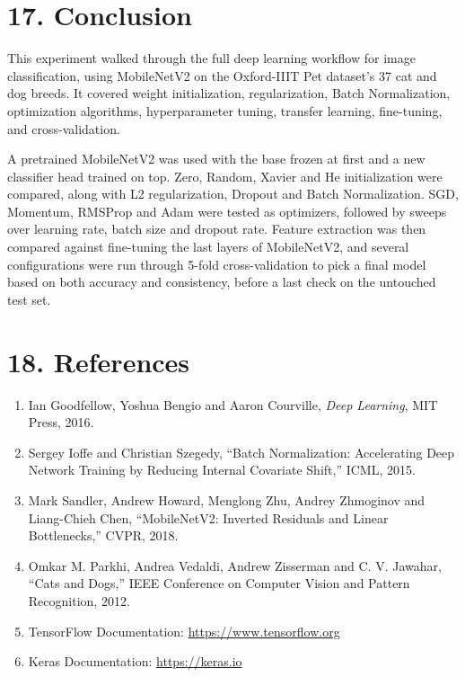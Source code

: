 \documentclass[10pt]{article}
\begin{document}
\section*{17. Conclusion}

This experiment walked through the full deep learning workflow for image classification, using MobileNetV2 on the Oxford-IIIT Pet dataset's 37 cat and dog breeds. It covered weight initialization, regularization, Batch Normalization, optimization algorithms, hyperparameter tuning, transfer learning, fine-tuning, and cross-validation.

A pretrained MobileNetV2 was used with the base frozen at first and a new classifier head trained on top. Zero, Random, Xavier and He initialization were compared, along with L2 regularization, Dropout and Batch Normalization. SGD, Momentum, RMSProp and Adam were tested as optimizers, followed by sweeps over learning rate, batch size and dropout rate. Feature extraction was then compared against fine-tuning the last layers of MobileNetV2, and several configurations were run through 5-fold cross-validation to pick a final model based on both accuracy and consistency, before a last check on the untouched test set.

\section*{18. References}

\begin{enumerate}
\item Ian Goodfellow, Yoshua Bengio and Aaron Courville,
\emph{Deep Learning}, MIT Press, 2016.

\item Sergey Ioffe and Christian Szegedy,
``Batch Normalization: Accelerating Deep Network Training by Reducing
Internal Covariate Shift,'' ICML, 2015.

\item Mark Sandler, Andrew Howard, Menglong Zhu, Andrey Zhmoginov and
Liang-Chieh Chen, ``MobileNetV2: Inverted Residuals and Linear
Bottlenecks,'' CVPR, 2018.

\item Omkar M. Parkhi, Andrea Vedaldi, Andrew Zisserman and C. V. Jawahar,
``Cats and Dogs,'' IEEE Conference on Computer Vision and Pattern
Recognition, 2012.

\item TensorFlow Documentation:
\url{https://www.tensorflow.org}

\item Keras Documentation:
\url{https://keras.io}
\end{enumerate}
\end{document}
